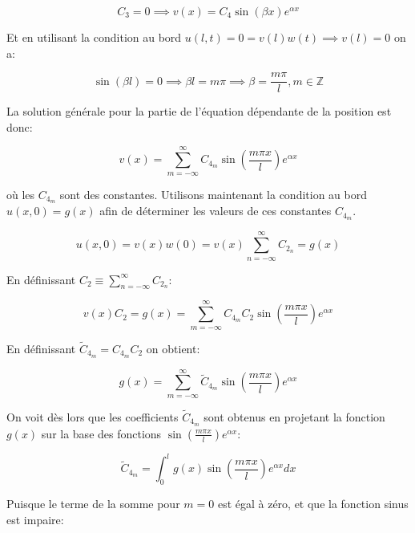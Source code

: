 \documentclass[a4paper, 12pt]{report}
\begin{document}
\begin{equation}
  C_3 = 0 \implies v(x) = C_4 \sin(\beta x) e^{\alpha x}
\end{equation}

Et en utilisant la condition au bord $u(l,t) = 0 = v(l) w(t) \implies v(l) = 0$ on a:

\begin{equation}
  \sin(\beta l) = 0 \implies \beta l = m \pi \implies \beta = \frac{m \pi}{l}, m \in \mathbb{Z}
\end{equation}

La solution générale pour la partie de l'équation dépendante de la position est
donc:

\begin{equation}
  \boxed{v(x) = \sum_{m=-\infty}^{\infty} C_{4_m} \sin \left (\frac{m \pi x}{l} \right ) e^{\alpha x}}
\end{equation}

où les $C_{4_m}$ sont des constantes. Utilisons maintenant la condition au bord
$u(x,0) = g(x)$ afin de déterminer les valeurs de ces constantes $C_{4_m}$.

\begin{equation}
  u(x,0) = v(x) w(0) = v(x) \sum_{n=-\infty}^{\infty} C_{2_n} = g(x)
\end{equation}

En définissant $C_2 \equiv \sum_{n=-\infty}^{\infty} C_{2_n}$:

\begin{equation}
  v(x) C_{2} = g(x) = \sum_{m=-\infty}^{\infty} C_{4_m}C_{2} \sin \left (\frac{m \pi x}{l} \right ) e^{\alpha x}
\end{equation}

En définissant $\tilde{C}_{4_m} = C_{4_m}C_{2}$ on obtient:

\begin{equation}
  g(x) = \sum_{m=-\infty}^{\infty} \tilde{C}_{4_m} \sin \left (\frac{m \pi x}{l} \right ) e^{\alpha x}
\end{equation}

On voit dès lors que les coefficients $\tilde{C}_{4_m}$ sont obtenus
en projetant la fonction $g(x)$ sur la base des fonctions $\sin \left (\frac{m \pi x}{l} \right ) e^{\alpha x}$:

\begin{equation}
  \tilde{C}_{4_m} = \int_0^l g(x) \sin \left (\frac{m \pi x}{l} \right ) e^{\alpha x} dx
\end{equation}

Puisque le terme de la somme pour $m=0$ est égal à zéro, et que la fonction
sinus est impaire:
\end{document}
